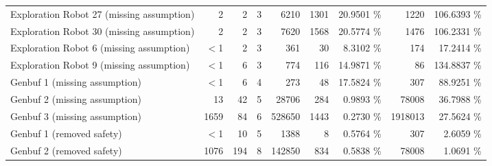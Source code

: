 \begin{tabular}{|l|rr|rr|rr|rr|}
  Exploration Robot 27 (missing assumption) & 2 & 2 & 3 & 6210 & 1301 & 20.9501 \% & 1220 & 106.6393 \% \\ 
  Exploration Robot 30 (missing assumption) & 2 & 2 & 3 & 7620 & 1568 & 20.5774 \% & 1476 & 106.2331 \% \\ 
  Exploration Robot 6 (missing assumption) & $<$1 & 2 & 3 & 361 & 30 &  8.3102 \% & 174 &  17.2414 \% \\ 
  Exploration Robot 9 (missing assumption) & $<$1 & 6 & 3 & 774 & 116 & 14.9871 \% & 86 & 134.8837 \% \\ 
  Genbuf 1 (missing assumption) & $<$1 & 6 & 4 & 273 & 48 & 17.5824 \% & 307 &  88.9251 \% \\ 
  Genbuf 2 (missing assumption) & 13 & 42 & 5 & 28706 & 284 &  0.9893 \% & 78008 &  36.7988 \% \\ 
  Genbuf 3 (missing assumption) & 1659 & 84 & 6 & 528650 & 1443 &  0.2730 \% & 1918013 &  27.5624 \% \\ 
  Genbuf 1 (removed safety) & $<$1 & 10 & 5 & 1388 & 8 &  0.5764 \% & 307 &   2.6059 \% \\ 
  Genbuf 2 (removed safety) & 1076 & 194 & 8 & 142850 & 834 &  0.5838 \% & 78008 &   1.0691 \% \\ 
   \hline
\end{tabular}
